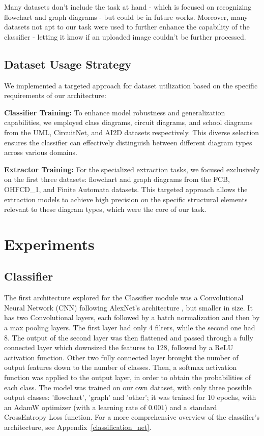 \documentclass[conference]{IEEEtran}
\begin{document}
Many datasets don't include the task at hand - which is focused on recognizing flowchart and graph diagrams - but could be in future works. Moreover, many datasets not apt to our task were used to further enhance the capability of the classifier - letting it know if an uploaded image couldn't be further processed.

\subsection{Dataset Usage Strategy}

We implemented a targeted approach for dataset utilization based on the specific requirements of our architecture:

\textbf{Classifier Training:} To enhance model robustness and generalization capabilities, we employed class diagrams, circuit diagrams, and school diagrams from the UML, CircuitNet, and AI2D datasets respectively. This diverse selection ensures the classifier can effectively distinguish between different diagram types across various domains.

\textbf{Extractor Training:} For the specialized extraction tasks, we focused exclusively on the first three datasets: flowchart and graph diagrams from the FCB, OHFCD\_1, and Finite Automata datasets. This targeted approach allows the extraction models to achieve high precision on the specific structural elements relevant to these diagram types, which were the core of our task. \\

\section{Experiments}

\subsection{Classifier}
\label{exp:classifier}
The first architecture explored for the Classifier module was a Convolutional Neural Network (CNN) following AlexNet's architecture \cite{alexnet}, but smaller in size.
It has two Convolutional layers, each followed by a batch normalization and then by a max pooling layers. The first layer had only 4 filters, while the second one had 8.
The output of the second layer was then flattened and passed through a fully connected layer which downsized the features to 128, followed by a ReLU activation function. Other two fully connected layer brought the number of output features down to the number of classes.
Then, a softmax activation function was applied to the output layer, in order to obtain the probabilities of each class.
The model was trained on our own dataset, with only three possible output classes: 'flowchart', 'graph' and 'other'; it was trained for 10 epochs, with an AdamW optimizer (with a learning rate of $0.001$) and a standard CrossEntropy Loss function. For a more comprehensive overview of the classifier's architecture, see Appendix~\ref{classification_net}.
\\
\end{document}
